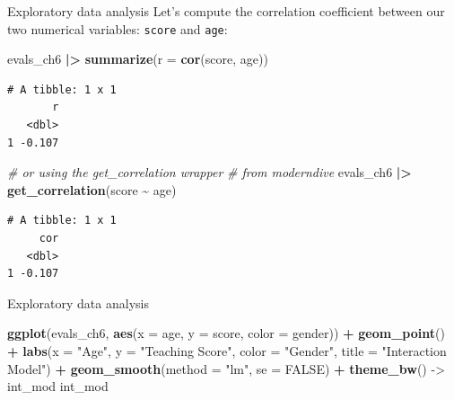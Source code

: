 \documentclass[
  ignorenonframetext,
]{beamer}
\newenvironment{Shaded}{\begin{snugshade}}{\end{snugshade}}
\newcommand{\AttributeTok}[1]{\textcolor[rgb]{0.13,0.29,0.53}{#1}}
\newcommand{\CommentTok}[1]{\textcolor[rgb]{0.56,0.35,0.01}{\textit{#1}}}
\newcommand{\ConstantTok}[1]{\textcolor[rgb]{0.56,0.35,0.01}{#1}}
\newcommand{\FunctionTok}[1]{\textcolor[rgb]{0.13,0.29,0.53}{\textbf{#1}}}
\newcommand{\NormalTok}[1]{#1}
\newcommand{\OtherTok}[1]{\textcolor[rgb]{0.56,0.35,0.01}{#1}}
\newcommand{\SpecialCharTok}[1]{\textcolor[rgb]{0.81,0.36,0.00}{\textbf{#1}}}
\newcommand{\StringTok}[1]{\textcolor[rgb]{0.31,0.60,0.02}{#1}}
\begin{document}
\begin{frame}[fragile]{Exploratory data analysis}
\label{exploratory-data-analysis-11}
Let's compute the correlation coefficient between our two numerical
variables: \texttt{score} and \texttt{age}:

\small

\begin{Shaded}
\begin{Highlighting}[]
\NormalTok{evals\_ch6 }\SpecialCharTok{|\textgreater{}} 
  \FunctionTok{summarize}\NormalTok{(}\AttributeTok{r =} \FunctionTok{cor}\NormalTok{(score, age))}
\end{Highlighting}
\end{Shaded}

\begin{verbatim}
# A tibble: 1 x 1
       r
   <dbl>
1 -0.107
\end{verbatim}

\begin{Shaded}
\begin{Highlighting}[]
\CommentTok{\# or using the get\_correlation wrapper}
\CommentTok{\# from moderndive}
\NormalTok{evals\_ch6 }\SpecialCharTok{|\textgreater{}} 
  \FunctionTok{get\_correlation}\NormalTok{(score }\SpecialCharTok{\textasciitilde{}}\NormalTok{ age)}
\end{Highlighting}
\end{Shaded}

\begin{verbatim}
# A tibble: 1 x 1
     cor
   <dbl>
1 -0.107
\end{verbatim}

\normalsize
\end{frame}

\begin{frame}[fragile]{Exploratory data analysis}
\label{exploratory-data-analysis-12}
\normalsize

\begin{Shaded}
\begin{Highlighting}[]
\FunctionTok{ggplot}\NormalTok{(evals\_ch6, }\FunctionTok{aes}\NormalTok{(}\AttributeTok{x =}\NormalTok{ age, }\AttributeTok{y =}\NormalTok{ score, }\AttributeTok{color =}\NormalTok{ gender)) }\SpecialCharTok{+}
  \FunctionTok{geom\_point}\NormalTok{() }\SpecialCharTok{+}
  \FunctionTok{labs}\NormalTok{(}\AttributeTok{x =} \StringTok{"Age"}\NormalTok{, }\AttributeTok{y =} \StringTok{"Teaching Score"}\NormalTok{, }\AttributeTok{color =} \StringTok{"Gender"}\NormalTok{,}
       \AttributeTok{title =} \StringTok{"Interaction Model"}\NormalTok{) }\SpecialCharTok{+}
  \FunctionTok{geom\_smooth}\NormalTok{(}\AttributeTok{method =} \StringTok{"lm"}\NormalTok{, }\AttributeTok{se =} \ConstantTok{FALSE}\NormalTok{) }\SpecialCharTok{+} 
  \FunctionTok{theme\_bw}\NormalTok{() }\OtherTok{{-}\textgreater{}}\NormalTok{ int\_mod}
\NormalTok{int\_mod}
\end{Highlighting}
\end{Shaded}

\normalsize
\end{frame}
\end{document}
